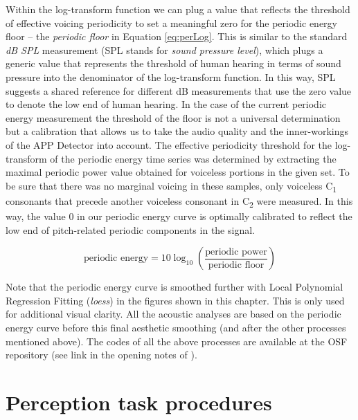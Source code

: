 Within the log-transform function we can plug a value that reflects the threshold of effective voicing periodicity to set a meaningful zero for the periodic energy floor -- the \emph{periodic floor} in Equation \eqref{eq:perLog}.
This is similar to the standard \emph{dB SPL} measurement (SPL stands for \emph{sound pressure level}), which plugs a generic value that represents the threshold of human hearing in terms of sound pressure into the denominator of the log-transform function. In this way, SPL suggests a shared reference for different dB measurements that use the zero value to denote the low end of human hearing.
In the case of the current periodic energy measurement the threshold of the floor is not a universal determination but a calibration that allows us to take the audio quality and the inner-workings of the APP Detector into account.
The effective periodicity threshold for the log-transform of the periodic energy time series was determined by extracting the maximal periodic power value obtained for voiceless portions in the given set. To be sure that there was no marginal voicing in these samples, only voiceless C\textsubscript{1} consonants that precede another voiceless consonant in C\textsubscript{2} were measured. In this way, the value 0 in our periodic energy curve is optimally calibrated to reflect the low end of pitch-related periodic components in the signal.

\begin{equation}
  \text{periodic energy} = 10 \log_{10}\!\left(\frac{\text{periodic power}}{\text{periodic floor}}\right) \label{eq:perLog}
\end{equation}

Note that the periodic energy curve is smoothed further with Local Polynomial Regression Fitting (\emph{loess}) in the figures shown in this chapter. This is only used for additional visual clarity. All the acoustic analyses are based on the periodic energy curve before this final aesthetic smoothing (and after the other processes mentioned above).
The codes of all the above processes are available at the OSF repository (see link in the opening notes of ).

\section{Perception task procedures}\label{sec:percproc}\largerpage

